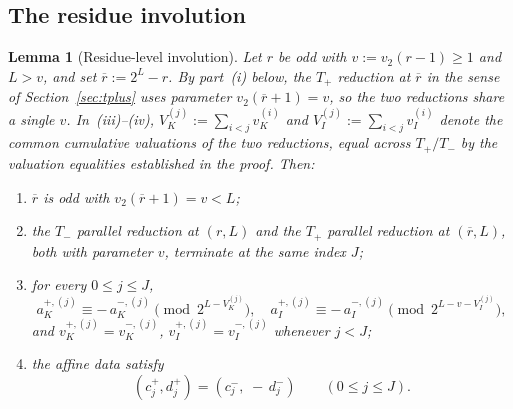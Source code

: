 \documentclass[11pt,reqno]{amsart}
\theoremstyle{plain}
\newtheorem{lemma}[theorem]{Lemma}
\theoremstyle{definition}
\theoremstyle{remark}
\newcommand{\Tplus}{T_{+}}
\newcommand{\Tminus}{T_{-}}
\newcommand{\Vk}{V_{K}}
\newcommand{\Vi}{V_{I}}
\newcommand{\vk}{v_{K}}
\newcommand{\vi}{v_{I}}
\newcommand{\vtwo}{v_{2}}
\begin{document}
\subsection{The residue involution}

\begin{lemma}[Residue-level involution]\label{lem:involution-step}
Let $r$ be odd with $v := \vtwo(r-1) \ge 1$ and $L > v$, and set
$\overline{r} := 2^L - r$. By part~(i) below, the $\Tplus$ reduction
at $\overline{r}$ in the sense of Section~\ref{sec:tplus} uses parameter
$\vtwo(\overline{r}+1) = v$, so the two reductions share a single $v$.
In~(iii)–(iv), $\Vk^{(j)} := \sum_{i < j} \vk^{(i)}$ and
$\Vi^{(j)} := \sum_{i < j} \vi^{(i)}$ denote the common cumulative
valuations of the two reductions, equal across $\Tplus/\Tminus$ by the
valuation equalities established in the proof. Then:
\begin{enumerate}[label=(\roman*)]
\item $\overline{r}$ is odd with $\vtwo(\overline{r} + 1) = v < L$;
\item the $\Tminus$ parallel reduction at $(r, L)$ and the $\Tplus$
  parallel reduction at $(\overline{r}, L)$, both with parameter $v$,
  terminate at the same index $J$;
\item for every $0 \le j \le J$,
\begin{equation}\label{eq:invol-residue}
a_K^{+,(j)} \equiv -\, a_K^{-,(j)} \pmod{2^{L - \Vk^{(j)}}},
\quad
a_I^{+,(j)} \equiv -\, a_I^{-,(j)} \pmod{2^{L - v - \Vi^{(j)}}},
\end{equation}
and $\vk^{+,(j)} = \vk^{-,(j)}$, $\vi^{+,(j)} = \vi^{-,(j)}$
whenever $j < J$;
\item the affine data satisfy
\begin{equation}\label{eq:invol-affine}
(c_j^{+}, d_j^{+}) = (c_j^{-},\; -\, d_j^{-}) \qquad (0 \le j \le J).
\end{equation}
\end{enumerate}
\end{lemma}
\end{document}
